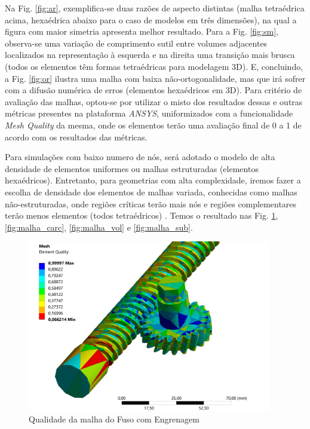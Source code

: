  Na Fig. \ref{fig:ar}, exemplifica-se duas razões de aspecto distintas (malha tetraédrica acima, hexaédrica abaixo para o caso de modelos em três dimensões), na qual a figura com maior simetria apresenta melhor resultado. Para a Fig. \ref{fig:sm}, 
observa-se uma variação de comprimento sutil entre volumes adjacentes localizados na representação à esquerda e na direita uma transição mais brusca (todos os elementos têm formas tetraédricas para modelagem 3D). E, concluindo, a Fig. \ref{fig:or} ilustra uma malha com baixa não-ortogonalidade, mas que irá sofrer com a difusão numérica de erros (elementos hexaédricos em 3D).  
Para critério de avaliação das malhas, optou-se por utilizar o misto dos resultados dessas e outras métricas presentes na plataforma \textit{ANSYS}, uniformizados com a funcionalidade \textit{Mesh Quality} da mesma, onde os elementos terão uma avaliação final de 0 a 1 de acordo com os resultados das métricas.

Para simulações com baixo numero de nós, será adotado o modelo de alta densidade de elementos uniformes ou malhas estruturadas (elementos hexaédricos). Entretanto, para geometrias com alta complexidade, iremos fazer a escolha de densidade dos elementos de malhas variada, conhecidas como malhas não-estruturadas, onde regiões críticas terão mais nós e regiões complementares terão menos elementos (todos tetraédricos) \cite{malha}. Temos o resultado nas Fig. \ref{fig:Malha_eng}, \ref{fig:malha_carc}, \ref{fig:malha_vol} e \ref{fig:malha_sub}.

\begin{figure}[ht]
        \centering
        \includegraphics[width=0.95\textwidth]{figuras/estrutura/Imagens PC3/Malhas/fuso engrenagem qualidade.png}
        \caption{Qualidade da malha do Fuso com Engrenagem}
        \label{fig:Malha_eng}
    \end{figure}
    
